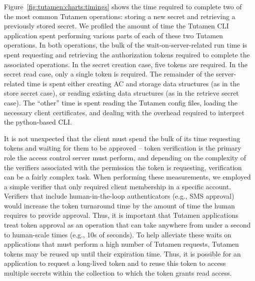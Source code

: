 Figure~\ref{fig:tutamen:charts:timings} shows the time required to complete two
of the most common Tutamen operations: storing a new secret and
retrieving a previously stored secret. We profiled the amount of time
the Tutamen CLI application spent performing various parts of each of
these two Tutamen operations. In both operations, the bulk of the
wait-on-server-related run time is spent requesting and retrieving the
authorization tokens required to complete the associated
operations. In the secret creation case, five tokens are required. In
the secret read case, only a single token is required. The remainder of
the server-related time is spent either creating AC and storage data
structures (as in the store secret case), or reading existing data
structures (as in the retrieve secret case). The ``other'' time is
spent reading the Tutamen config files, loading the necessary client
certificates, and dealing with the overhead required to interpret the
python-based CLI.

It is not unexpected that the client must spend the bulk of its time
requesting tokens and waiting for them to be approved -- token
verification is the primary role the access control server must
perform, and depending on the complexity of the verifiers associated
with the permission the token is requesting, verification can be a
fairly complex task. When performing these measurements, we employed a
simple verifier that only required client membership in a specific
account. Verifiers that include human-in-the-loop authenticators
(e.g., SMS approval) would increase the token turnaround time by the
amount of time the human requires to provide approval. Thus, it is
important that Tutamen applications treat token approval as an
operation that can take anywhere from under a second to human-scale
times (e.g., 10s of seconds). To help alleviate these waits on
applications that must perform a high number of Tutamen requests,
Tutamen tokens may be reused up until their expiration time. Thus, it
is possible for an application to request a long-lived token and to
reuse this token to access multiple secrets within the collection to
which the token grants read access.

